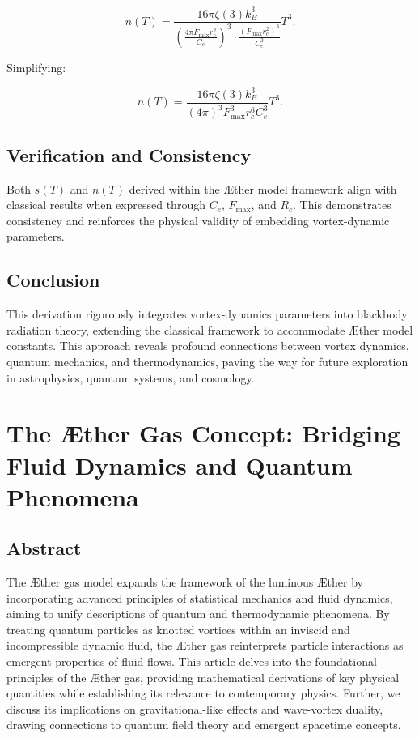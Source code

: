 \documentclass[a4paper,10pt]{article}
\begin{document}
  \begin{equation*}
   n(T) = \frac{16 \pi \zeta(3) k_B^3}{\left(\frac{4 \pi F_{\max} r_c^2}{C_e}\right)^3 \cdot \frac{(F_{\max} r_c^2)^3}{C_e^3}} T^3.
  \end{equation*}

  Simplifying:

  \begin{equation*}
   n(T) = \frac{16 \pi \zeta(3) k_B^3}{(4 \pi)^3 F_{\max}^3 r_c^6 C_e^3} T^3.
  \end{equation*}

  \subsection*{Verification and Consistency}
  Both $s(T)$ and $n(T)$ derived within the Æther model framework align with classical results when expressed through $C_e$, $F_{\max}$, and $R_c$. This demonstrates consistency and reinforces the physical validity of embedding vortex-dynamic parameters.

  \subsection*{Conclusion}
  This derivation rigorously integrates vortex-dynamics parameters into blackbody radiation theory, extending the classical framework to accommodate Æther model constants. This approach reveals profound connections between vortex dynamics, quantum mechanics, and thermodynamics, paving the way for future exploration in astrophysics, quantum systems, and cosmology.

    
\section{The Æther Gas Concept: Bridging Fluid Dynamics and Quantum Phenomena}


\subsection*{Abstract}
The Æther gas model expands the framework of the luminous Æther by incorporating advanced principles of statistical mechanics and fluid dynamics, aiming to unify descriptions of quantum and thermodynamic phenomena. By treating quantum particles as knotted vortices within an inviscid and incompressible dynamic fluid, the Æther gas reinterprets particle interactions as emergent properties of fluid flows. This article delves into the foundational principles of the Æther gas, providing mathematical derivations of key physical quantities while establishing its relevance to contemporary physics. Further, we discuss its implications on gravitational-like effects and wave-vortex duality, drawing connections to quantum field theory and emergent spacetime concepts.
\end{document}
